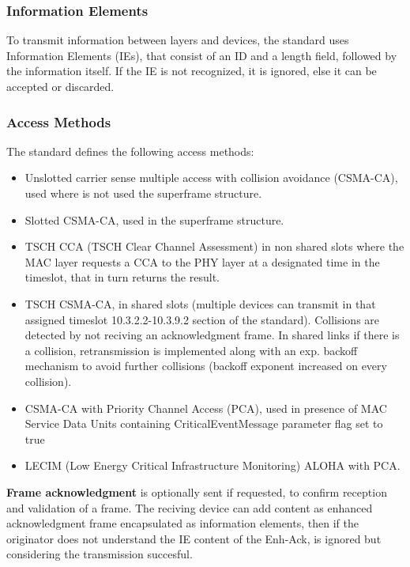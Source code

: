 \documentclass[conference]{IEEEtran}
\begin{document}
\subsubsection{Information Elements}
To transmit information between layers and devices, the standard uses Information Elements 
(IEs), that consist of an ID and a length field, followed by the information itself. If the
IE is not recognized, it is ignored, else it can be accepted or discarded.\\

\subsubsection{Access Methods}
The standard defines the following access methods:
\begin{itemize}
    \item Unslotted carrier sense multiple access with collision avoidance (CSMA-CA), 
          used where is not used the superframe structure.
    \item Slotted CSMA-CA, used in the superframe structure.
    \item TSCH CCA (TSCH Clear Channel Assessment) in non shared slots where the MAC layer requests a CCA
          to the PHY layer at a designated time in the timeslot,
          that in turn returns the result.
    \item TSCH CSMA-CA, in shared slots (multiple devices can transmit in that assigned 
          timeslot 10.3.2.2-10.3.9.2 section of the standard). Collisions are detected by not
          reciving an acknowledgment frame. In shared links if there is a collision, 
          retransmission is implemented along with an exp. backoff mechanism to avoid further
          collisions (backoff exponent increased on every collision).
    \item CSMA-CA with Priority Channel Access (PCA), used in presence of MAC Service Data 
          Units containing CriticalEventMessage parameter flag set to true
    \item LECIM (Low Energy Critical Infrastructure Monitoring) ALOHA with PCA.
\end{itemize}

\textbf{Frame acknowledgment} is optionally sent if requested, to confirm reception and
validation of a frame. The reciving device can add content as enhanced acknowledgment frame
encapsulated as information elements, then if the originator does not understand the IE 
content of the Enh-Ack, is ignored but considering the transmission succesful.\\
\end{document}
